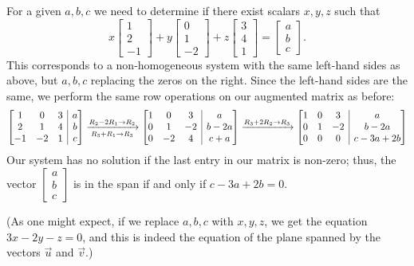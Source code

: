 \documentclass[12pt]{article}
\makeatletter
\newenvironment{amatrix}[1]{%
  \left[\begin{array}{@{}*{#1}{c}|c@{}}
}{%
  \end{array}\right]
}
\newcommand{\bbm}{\begin{bmatrix}}
\newcommand{\ebm}{\end{bmatrix}}
\newcommand{\bam}{\begin{amatrix}}
\newcommand{\eam}{\end{amatrix}}
\makeatother
\begin{document}
\begin{enumerate}
For a given $a,b,c$ we need to determine if there exist scalars $x,y,z$ such that
\[x\bbm 1\\2\\-1\ebm+y \bbm 0\\1\\-2\ebm+z \bbm 3\\4\\1\ebm=\bbm a\\b\\c\ebm.\]
This corresponds to a non-homogeneous system with the same left-hand sides as above, but $a,b,c$ replacing the zeros on the right. Since the left-hand sides are the same, we perform the same row operations on our augmented matrix as before:
\[
\bam{3}1&0&3&a\\2&1&4&b\\-1&-2&1&c\eam \xrightarrow[R_3+R_1\to R_3]{R_2-2R_1\to R_2}\bam{3}1&0&3&a\\0&1&-2&b-2a\\0&-2&4&c+a\eam \xrightarrow{R_3+2R_2\to R_3}\bam{3}1&0&3&a\\0&1&-2&b-2a\\0&0&0&c-3a+2b\eam
\]
Our system has no solution if the last entry in our matrix is non-zero; thus, the vector $\bbm a\\b\\c\ebm$ is in the span if and only if $c-3a+2b=0$.

(As one might expect, if we replace $a,b,c$ with $x,y,z$, we get the equation $3x-2y-z=0$, and this is indeed the equation of the plane spanned by the vectors $\vec{u}$ and $\vec{v}$.)
 \end{enumerate}
 
\end{document}
